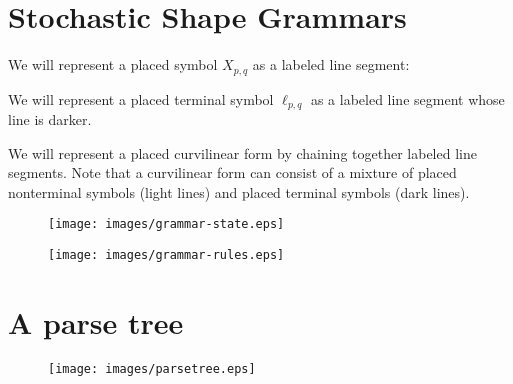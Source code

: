 
\section{Stochastic Shape Grammars}

We will represent a placed symbol $X_{p,q}$ as a labeled line segment:

We will represent a placed terminal symbol $\ell_{p,q}$ as a labeled
line segment whose line is darker.

We will represent a placed curvilinear form by chaining together
labeled line segments. Note that a curvilinear form can consist of a
mixture of placed nonterminal symbols (light lines) and placed
terminal symbols (dark lines).


\begin{figure}
\texttt{[image: images/grammar-state.eps]}
\end{figure}

\begin{figure}
\texttt{[image: images/grammar-rules.eps]}
\end{figure}

\section{A parse tree}

\begin{figure}
\texttt{[image: images/parsetree.eps]}
\end{figure}
